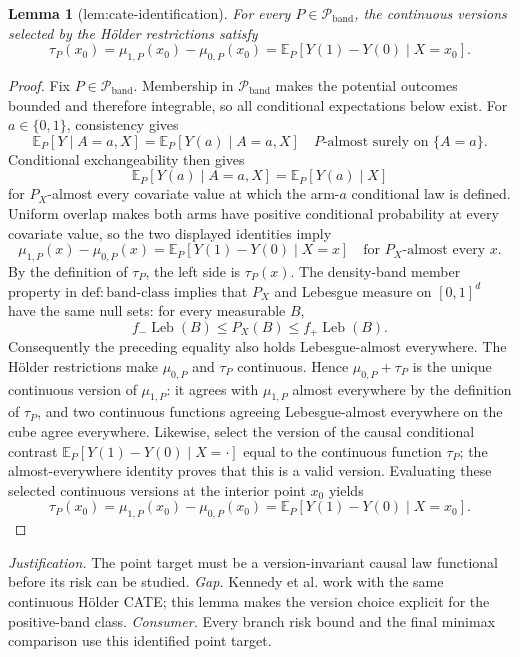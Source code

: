 \documentclass{article}
\newtheorem{lemma}{Lemma}
\begin{document}
\begin{lemma}[lem:cate-identification]\label{lem:cate-identification}
For every \(P\in\mathcal{P}_{\mathrm{band}}\), the continuous versions selected by the H\"older restrictions satisfy \[\tau_P(x_0)=\mu_{1,P}(x_0)-\mu_{0,P}(x_0)=\mathbb{E}_P[Y(1)-Y(0)\mid X=x_0].\]
\end{lemma}
\begin{proof}
Fix \(P\in\mathcal P_{\mathrm{band}}\).  Membership in \(\mathcal P_{\mathrm{band}}\) makes the potential outcomes bounded and therefore integrable, so all conditional expectations below exist.  For \(a\in\{0,1\}\), consistency gives
\[
 \mathbb E_P[Y\mid A=a,X]
 =\mathbb E_P[Y(a)\mid A=a,X]
 \quad P\text{-almost surely on }\{A=a\}.
\]
Conditional exchangeability then gives
\[
 \mathbb E_P[Y(a)\mid A=a,X]
 =\mathbb E_P[Y(a)\mid X]
\]
for \(P_X\)-almost every covariate value at which the arm-\(a\) conditional law is defined.  Uniform overlap makes both arms have positive conditional probability at every covariate value, so the two displayed identities imply
\[
 \mu_{1,P}(x)-\mu_{0,P}(x)
 =\mathbb E_P[Y(1)-Y(0)\mid X=x]
 \quad\text{for }P_X\text{-almost every }x.
\]
By the definition of \(\tau_P\), the left side is \(\tau_P(x)\).  The density-band member property in \(\mathrm{def:band\mbox{-}class}\) implies that \(P_X\) and Lebesgue measure on \([0,1]^d\) have the same null sets: for every measurable \(B\),
\[
 f_-\operatorname{Leb}(B)\le P_X(B)\le f_+\operatorname{Leb}(B).
\]
Consequently the preceding equality also holds Lebesgue-almost everywhere.  The H\"older restrictions make \(\mu_{0,P}\) and \(\tau_P\) continuous.  Hence \(\mu_{0,P}+\tau_P\) is the unique continuous version of \(\mu_{1,P}\): it agrees with \(\mu_{1,P}\) almost everywhere by the definition of \(\tau_P\), and two continuous functions agreeing Lebesgue-almost everywhere on the cube agree everywhere.  Likewise, select the version of the causal conditional contrast \(\mathbb E_P[Y(1)-Y(0)\mid X=\cdot]\) equal to the continuous function \(\tau_P\); the almost-everywhere identity proves that this is a valid version.  Evaluating these selected continuous versions at the interior point \(x_0\) yields
\[
 \tau_P(x_0)=\mu_{1,P}(x_0)-\mu_{0,P}(x_0)
 =\mathbb E_P[Y(1)-Y(0)\mid X=x_0].
\]
\end{proof}
\par\smallskip\noindent \textit{Justification.} The point target must be a version-invariant causal law functional before its risk can be studied. \textit{Gap.} Kennedy et al. work with the same continuous H\"older CATE; this lemma makes the version choice explicit for the positive-band class. \textit{Consumer.} Every branch risk bound and the final minimax comparison use this identified point target.
\end{document}

